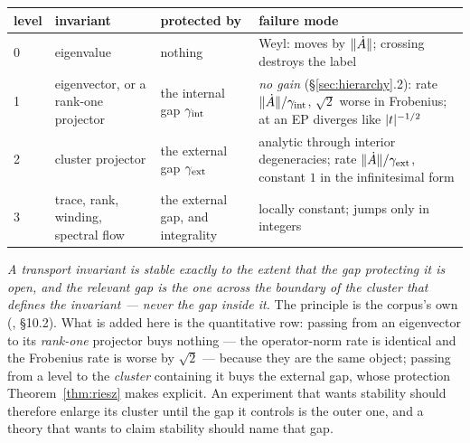 \begin{center}
\begin{tabular}{@{}p{0.6cm}p{3.4cm}p{3.4cm}p{4.2cm}@{}}
\toprule
level & invariant & protected by & failure mode \\
\midrule
0 & eigenvalue & nothing & Weyl: moves by $\lVert\dot A\rVert$; crossing destroys the label \\
1 & eigenvector, or a rank-one projector & the internal gap $\gamma_{\mathrm{int}}$ &
\emph{no gain} (\S\ref{sec:hierarchy}.2): rate $\lVert\dot A\rVert/\gamma_{\mathrm{int}}$, $\sqrt2$ worse in Frobenius; at an EP diverges like $\lvert t\rvert^{-1/2}$ \\
2 & cluster projector & the external gap $\gamma_{\mathrm{ext}}$ &
analytic through interior degeneracies; rate $\lVert\dot A\rVert/\gamma_{\mathrm{ext}}$, constant $1$ in the infinitesimal form \\
3 & trace, rank, winding, spectral flow & the external gap, and integrality & locally constant; jumps only in integers \\
\bottomrule
\end{tabular}
\end{center}

\begin{remark}\label{rem:principle}
\emph{A transport invariant is stable exactly to the extent that the gap protecting it is open,
and the relevant gap is the one across the boundary of the cluster that defines the invariant ---
never the gap inside it.} The principle is the corpus's own (\cite{iqgt}, \S10.2). What is added
here is the quantitative row: passing from an eigenvector to its \emph{rank-one} projector buys
nothing --- the operator-norm rate is identical and the Frobenius rate is worse by $\sqrt2$ ---
because they are the same object; passing from a level to the \emph{cluster} containing it buys
the external gap, whose protection Theorem~\ref{thm:riesz} makes explicit. An experiment that wants stability should
therefore enlarge its cluster until the gap it controls is the outer one, and a theory that wants
to claim stability should name that gap.
\end{remark}
